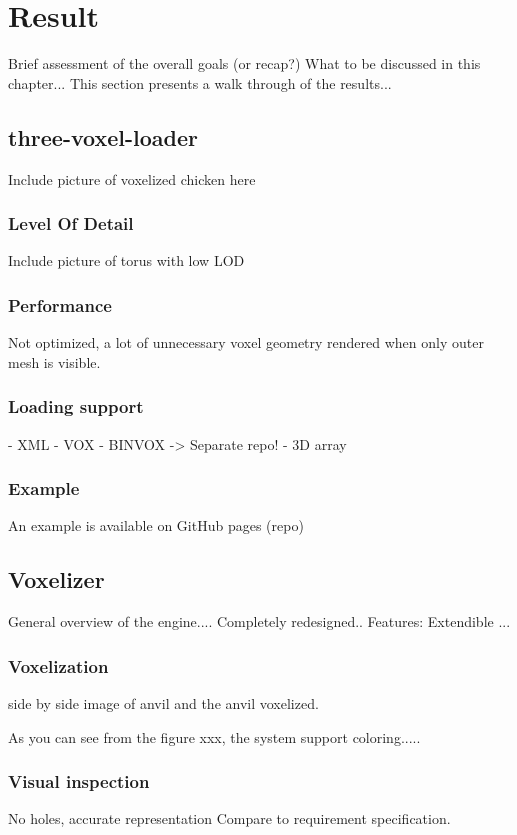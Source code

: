 \chapter{Result}

Brief assessment of the overall goals (or recap?) What to be discussed in this chapter...
This section presents a walk through of the results...

\section{three-voxel-loader}
Include picture of voxelized chicken here
\subsection{Level Of Detail}
Include picture of torus with low LOD
\subsection{Performance}
Not optimized, a lot of unnecessary voxel geometry rendered when only outer mesh is visible.
\subsection{Loading support}
- XML
- VOX
- BINVOX -> Separate repo!
- 3D array

\subsection{Example}
An example is available on GitHub pages (repo)

\section{Voxelizer}
General overview of the engine.... Completely redesigned.. Features: Extendible ...
\subsection{Voxelization}

side by side image of anvil and the anvil voxelized.

As you can see from the figure xxx, the system support coloring.....

\subsection{Visual inspection}
No holes, accurate representation
Compare to requirement specification.

